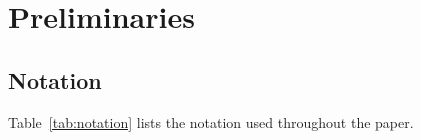 \section{Preliminaries}
\label{sec:prelim}

\subsection{Notation}
\label{sec:notation}

Table~\ref{tab:notation} lists the notation used throughout the paper.


